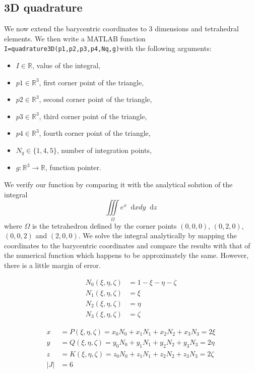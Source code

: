 \documentclass{report}
\renewcommand*\d{\mathop{}\!\mathrm{d}}
\begin{document}
\subsection{3D quadrature}

We now extend the barycentric coordinates to 3 dimensions and tetrahedral elements. We then write a MATLAB function \texttt{I=quadrature3D(p1,p2,p3,p4,Nq,g)}with the following arguments:
\begin{itemize}
	\item $I\in\mathbb{R}$, value of the integral,
	\item $p1\in\mathbb{R}^3$, first corner point of the triangle,
	\item $p2\in\mathbb{R}^3$, second corner point of the triangle,
	\item $p3\in\mathbb{R}^3$, third corner point of the triangle,
	\item $p4\in\mathbb{R}^3$, fourth corner point of the triangle,
	\item $N_q \in{\{1,4,5\}}$, number of integration points,
	\item $g: \mathbb{R}^3 \rightarrow \mathbb{R}$, function pointer.
\end{itemize}

We verify our function by comparing it with the analytical solution of the integral
\begin{equation}
	\iiint \limits_{\Omega} e^x \d x dy  \d z
\end{equation}
where $\Omega$ is the tetrahedron defined by the corner points $(0, 0, 0)$, $(0, 2, 0)$, $(0, 0, 2)$ and $(2, 0, 0)$. We solve the integral analytically by mapping the coordinates to the barycentric coordinates and compare the results with that of the numerical function which happens to be approximately the same. However, there is a little margin of error.  

\begin{align}
	N_0 (\xi,\eta,\zeta)&=1-\xi-\eta-\zeta\\ 
	N_1 (\xi,\eta,\zeta)&=\xi\\
	N_2 (\xi,\eta,\zeta)&=\eta\\
	N_3 (\xi,\eta,\zeta)&=\zeta
\end{align}

\begin{align}
	x&= P(\xi,\eta,\zeta)= x_0 N_0 +x_1 N_1 +x_2 N_2 +x_3 N_3 = 2\xi\\
	y&= Q(\xi,\eta,\zeta)= y_0 N_0 +y_1 N_1 +y_2 N_2 +y_3 N_3  = 2\eta\\ 
	z&= K(\xi,\eta,\zeta)= z_0 N_0 +z_1 N_1 +z_2 N_2 +z_3 N_3  = 2\zeta\\ 
	|J| &=6
\end{align}
\end{document}
